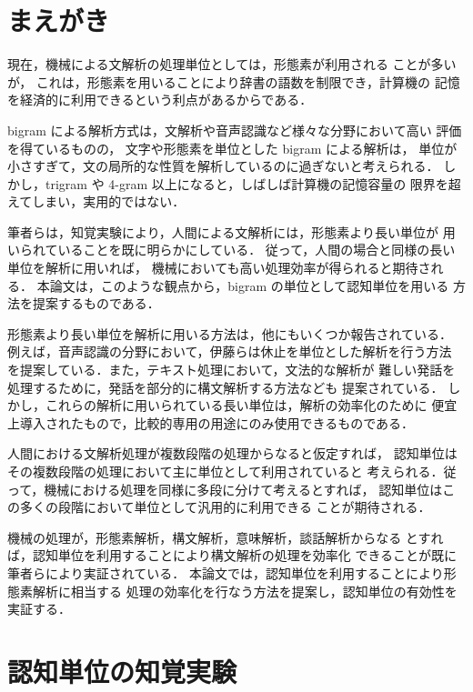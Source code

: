\maketitle

\section{まえがき}

現在，機械による文解析の処理単位としては，形態素が利用される
ことが多いが，
これは，形態素を用いることにより辞書の語数を制限でき，計算機の
記憶を経済的に利用できるという利点があるからである．

bigram による解析方式は，文解析や音声認識など様々な分野において高い
評価を得ているものの\cite{jeli,naka}，
文字や形態素を単位とした bigram による解析は，
単位が小さすぎて，文の局所的な性質を解析しているのに過ぎないと考えられる．
しかし，trigram や 4-gram 以上になると，しばしば計算機の記憶容量の
限界を超えてしまい，実用的ではない．

筆者らは，知覚実験により，人間による文解析には，形態素より長い単位が
用いられていることを既に明らかにしている\cite{yoko,yoko0}．
従って，人間の場合と同様の長い単位を解析に用いれば，
機械においても高い処理効率が得られると期待される．
本論文は，このような観点から，bigram の単位として認知単位を用いる
方法を提案するものである．

形態素より長い単位を解析に用いる方法は，他にもいくつか報告されている．
例えば，音声認識の分野において，伊藤らは休止を単位とした解析を行う方法
を提案している\cite{ito}．また，テキスト処理において，文法的な解析が
難しい発話を処理するために，発話を部分的に構文解析する方法なども
提案されている．
しかし，これらの解析に用いられている長い単位は，解析の効率化のために
便宜上導入されたもので，比較的専用の用途にのみ使用できるものである．

人間における文解析処理が複数段階の処理からなると仮定すれば，
認知単位はその複数段階の処理において主に単位として利用されていると
考えられる．従って，機械における処理を同様に多段に分けて考えるとすれば，
認知単位はこの多くの段階において単位として汎用的に利用できる
ことが期待される．

機械の処理が，形態素解析，構文解析，意味解析，談話解析からなる
とすれば，認知単位を利用することにより構文解析の処理を効率化
できることが既に筆者らにより実証されている\cite{yoko0}．
本論文では，認知単位を利用することにより形態素解析に相当する
処理の効率化を行なう方法を提案し，認知単位の有効性を実証する．


\section{認知単位の知覚実験}

